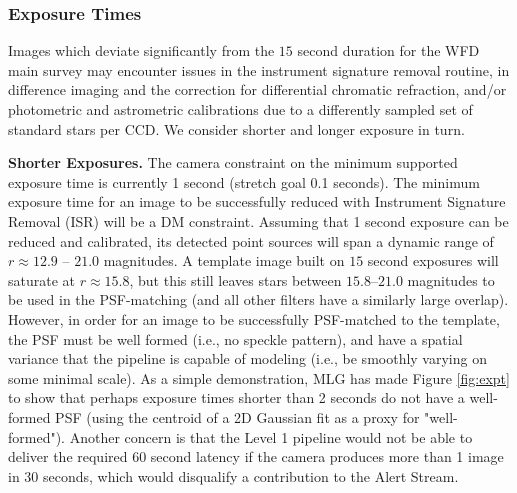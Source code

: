 \documentclass[DM,lsstdraft,toc]{lsstdoc}
\begin{document}
\subsubsection{Exposure Times}

Images which deviate significantly from the $15$ second duration for the WFD main survey may encounter issues in the instrument signature removal routine, in difference imaging and the correction for differential chromatic refraction, and/or photometric and astrometric calibrations due to a differently sampled set of standard stars per CCD. We consider shorter and longer exposure in turn.

\textbf{Shorter Exposures.} The camera constraint on the minimum supported exposure time is currently 1 second (stretch goal 0.1 seconds). The minimum exposure time for an image to be successfully reduced with Instrument Signature Removal (ISR) will be a DM constraint. Assuming that 1 second exposure can be reduced and calibrated, its detected point sources will span a dynamic range of $r \approx 12.9$ -- $21.0$ magnitudes. A template image built on $15$ second exposures will saturate at $r \approx 15.8$, but this still leaves stars between $15.8$--$21.0$ magnitudes to be used in the PSF-matching (and all other filters have a similarly large overlap). However, in order for an image to be successfully PSF-matched to the template, the PSF must be well formed (i.e., no speckle pattern), and have a spatial variance that the pipeline is capable of modeling (i.e., be smoothly varying on some minimal scale). As a simple demonstration, MLG has made Figure \ref{fig:expt} to show that perhaps exposure times shorter than 2 seconds do not have a well-formed PSF (using the centroid of a 2D Gaussian fit as a proxy for "well-formed"). Another concern is that the Level 1 pipeline would not be able to deliver the required $60$ second latency if the camera produces more than 1 image in 30 seconds, which would disqualify a contribution to the Alert Stream.
\end{document}
